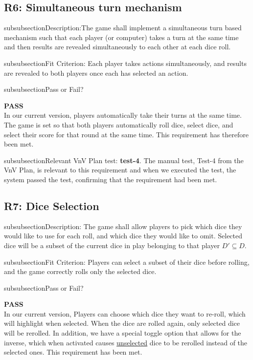 \documentclass[12pt, titlepage]{article}
\begin{document}
\subsection{R6: Simultaneous turn mechanism} 

\*subsubsection{Description:}The game shall implement a simultaneous turn based mechanism such that each player (or computer) takes a turn at the same time and then results are revealed simultaneously to each other at each dice roll.

\*subsubsection{Fit Criterion:} Each player takes actions simultaneously, and results are revealed to both players once each has selected an action.

\*subsubsection{Pass or Fail?} 

 \noindent \textbf{PASS}\\
 
 \noindent In our current version, players automatically take their turns at the same time. The game is set so that both players automatically roll dice, select dice, and select their score for that round at the same time. This requirement has therefore been met.

\*subsubsection{Relevant VnV Plan test: } \textbf{test-4}.  The manual test, Test-4 from the VnV Plan, is relevant to this requirement and when we executed the test, the system passed the test, confirming that the requirement had been met.

\subsection{R7: Dice Selection} 

\*subsubsection{Description:} The game shall allow players to pick which dice they would like to use for each roll, and which dice they would like to omit. Selected dice will be a subset of the current dice in play belonging to that player $D' \subseteq D$.

\*subsubsection{Fit Criterion:} Players can select a subset of their dice before rolling, and the game correctly rolls only the selected dice.


\*subsubsection{Pass or Fail?} 

 \noindent \textbf{PASS}\\
 
 \noindent In our current version, Players can choose which dice they want to re-roll, which will highlight when selected. When the dice are rolled again, only selected dice will be rerolled. In addition, we have a special toggle option that allows for the inverse, which when activated causes \underline{unselected} dice to be rerolled instead of the selected ones. This requirement has been met.
\end{document}
